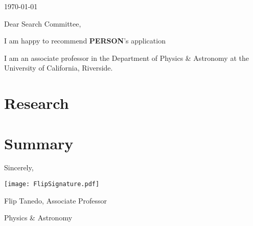\documentclass[12pt]{article}
\begin{document}
\thispagestyle{flipsfirstpage} 	%
\vspace*{.25in}
\today

\bigskip  

Dear Search Committee, \par \bigskip 

I am happy to recommend \textbf{PERSON}'s application 

I am an associate professor in the Department of Physics \& Astronomy at the University of California, Riverside. 

\section*{Research}
\lipsum[1-4]


\section*{Summary}

\lipsum[1]



\vspace{1cm}
\hspace{.5\textwidth}
\begin{minipage}[]{5in}
Sincerely, \par \medskip


\texttt{[image: FlipSignature.pdf]} \par
Flip Tanedo, \; %
Associate Professor \par
{} Physics \& Astronomy
\end{minipage}

\end{document}
